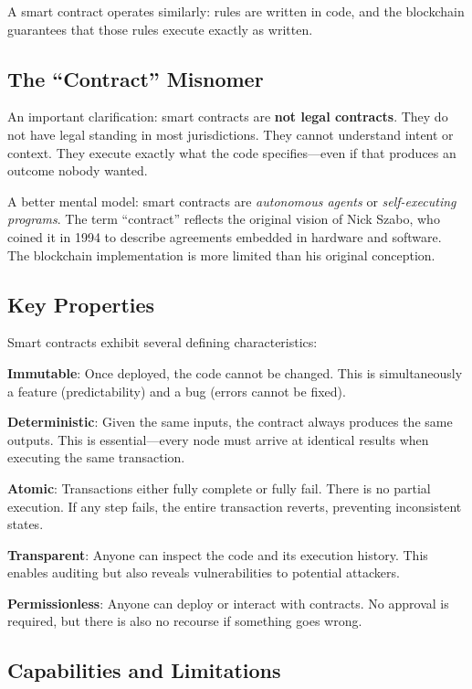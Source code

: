 \documentclass[11pt,a4paper]{article}
\newcommand{\keyword}[1]{\textbf{\textcolor{AccentOrange}{#1}}}
\begin{document}
A smart contract operates similarly: rules are written in code, and the blockchain guarantees that those rules execute exactly as written.

\subsection{The ``Contract'' Misnomer}

An important clarification: smart contracts are \keyword{not legal contracts}. They do not have legal standing in most jurisdictions. They cannot understand intent or context. They execute exactly what the code specifies---even if that produces an outcome nobody wanted.

A better mental model: smart contracts are \textit{autonomous agents} or \textit{self-executing programs}. The term ``contract'' reflects the original vision of Nick Szabo, who coined it in 1994 to describe agreements embedded in hardware and software. The blockchain implementation is more limited than his original conception.

\subsection{Key Properties}

Smart contracts exhibit several defining characteristics:

\textbf{Immutable}: Once deployed, the code cannot be changed. This is simultaneously a feature (predictability) and a bug (errors cannot be fixed).

\textbf{Deterministic}: Given the same inputs, the contract always produces the same outputs. This is essential---every node must arrive at identical results when executing the same transaction.

\textbf{Atomic}: Transactions either fully complete or fully fail. There is no partial execution. If any step fails, the entire transaction reverts, preventing inconsistent states.

\textbf{Transparent}: Anyone can inspect the code and its execution history. This enables auditing but also reveals vulnerabilities to potential attackers.

\textbf{Permissionless}: Anyone can deploy or interact with contracts. No approval is required, but there is also no recourse if something goes wrong.

\subsection{Capabilities and Limitations}
\end{document}
